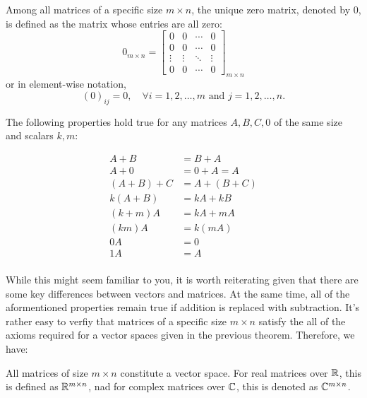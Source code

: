 \documentclass[12pt]{article}
\begin{document}
\begin{definition}
    Among all matrices of a specific size $m \times n$, the unique zero matrix, denoted by $0$, is defined as the matrix whose entries are all zero:
    \[
    0_{m \times n} =
    \begin{bmatrix}
    0 & 0 & \cdots & 0 \\
    0 & 0 & \cdots & 0 \\
    \vdots & \vdots & \ddots & \vdots \\
    0 & 0 & \cdots & 0
    \end{bmatrix}_{m \times n}
    \]
    or in element-wise notation,
    \[
    (0)_{ij} = 0, \quad \forall i = 1,2,\ldots,m \text{ and } j = 1,2,\ldots,n.
    \]
\end{definition}

\begin{theorem}
    The following properties hold true for any matrices $A, B, C, 0$ of the same size and scalars $k, m$:

    \begin{align*}
        A + B &= B + A \\
        A + 0 &= 0 + A = A \\
        (A + B) + C &= A + (B + C) \\
        k(A + B) &= kA + kB \\
        (k + m)A &= kA + mA \\
        (km)A &= k(mA) \\
        0A &= 0 \\
        1A &= A\\
    \end{align*}
\end{theorem}

While this might seem familiar to you, it is worth reiterating given that there are some key differences between vectors and matrices. At the same time, all of the aformentioned properties remain true if addition is replaced with subtraction. It's rather easy to verfiy that matrices of a specific size $m \times n$ satisfy the all of the axioms required for a vector spaces given in the previous theorem. Therefore, we have:

\begin{theorem}
    All matrices of size $m \times n$ constitute a vector space. For real matrices over $\mathbb{R}$, this is defined as $\mathbb{R}^{m \times n}$, nad for complex matrices over $\mathbb{C}$, this is denoted as $\mathbb{C}^{m \times n}$. 
\end{theorem}
\end{document}
